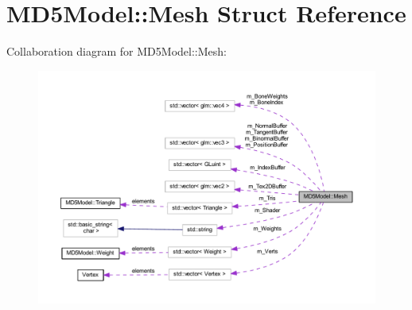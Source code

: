 \hypertarget{struct_m_d5_model_1_1_mesh}{}\section{M\+D5\+Model\+:\+:Mesh Struct Reference}
\label{struct_m_d5_model_1_1_mesh}


Collaboration diagram for M\+D5\+Model\+:\+:Mesh\+:
\nopagebreak
\begin{figure}[H]
\begin{center}
\leavevmode
\includegraphics[width=350pt]{struct_m_d5_model_1_1_mesh__coll__graph}
\end{center}
\end{figure}
